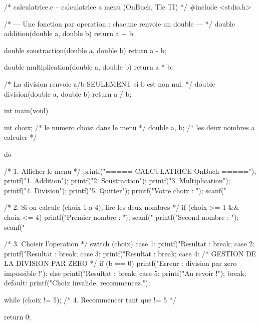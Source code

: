 \begin{codec}
/* calculatrice.c -- calculatrice a menu (OnBuch, Tle TI) */
#include <stdio.h>

/* --- Une fonction par operation : chacune renvoie un double --- */
double addition(double a, double b) {
    return a + b;
}

double soustraction(double a, double b) {
    return a - b;
}

double multiplication(double a, double b) {
    return a * b;
}

/* La division renvoie a/b SEULEMENT si b est non nul. */
double division(double a, double b) {
    return a / b;
}

int main(void) {
    int choix;       /* le numero choisi dans le menu     */
    double a, b;     /* les deux nombres a calculer        */

    do {
        /* 1. Afficher le menu */
        printf("\n===== CALCULATRICE OnBuch =====\n");
        printf("1. Addition\n");
        printf("2. Soustraction\n");
        printf("3. Multiplication\n");
        printf("4. Division\n");
        printf("5. Quitter\n");
        printf("Votre choix : ");
        scanf("%

        /* 2. Si on calcule (choix 1 a 4), lire les deux nombres */
        if (choix >= 1 && choix <= 4) {
            printf("Premier nombre  : ");
            scanf("%
            printf("Second nombre   : ");
            scanf("%
        }

        /* 3. Choisir l'operation */
        switch (choix) {
            case 1:
                printf("Resultat : %
                break;
            case 2:
                printf("Resultat : %
                break;
            case 3:
                printf("Resultat : %
                break;
            case 4:
                /* GESTION DE LA DIVISION PAR ZERO */
                if (b == 0) {
                    printf("Erreur : division par zero impossible !\n");
                } else {
                    printf("Resultat : %
                }
                break;
            case 5:
                printf("Au revoir !\n");
                break;
            default:
                printf("Choix invalide, recommencez.\n");
        }
    } while (choix != 5);   /* 4. Recommencer tant que != 5 */

    return 0;
}
\end{codec}

